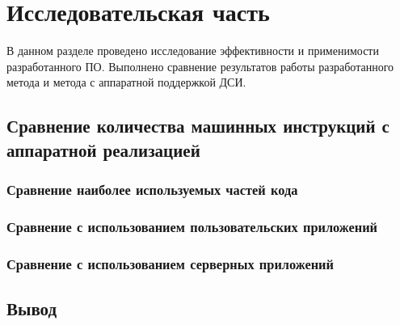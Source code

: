 \section{Исследовательская часть}

В данном разделе проведено исследование эффективности и применимости разработанного ПО. Выполнено сравнение результатов работы разработанного метода и метода с аппаратной поддержкой ДСИ.

\subsection{Сравнение количества машинных инструкций с аппаратной реализацией}

\subsubsection{Сравнение наиболее используемых частей кода}

\subsubsection{Сравнение с использованием пользовательских приложений}

\subsubsection{Сравнение с использованием серверных приложений}

\subsection{Вывод}

\pagebreak
